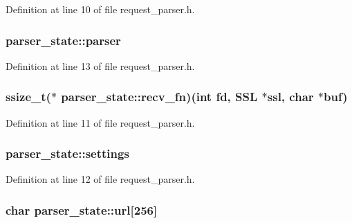 Definition at line 10 of file request\-\_\-parser.\-h.

\hypertarget{structparser__state_aaf6745c9db055761cd8da5f0d5e76d04}{
\subsubsection[{parser}]{ parser\-\_\-state\-::parser}}\label{structparser__state_aaf6745c9db055761cd8da5f0d5e76d04}


Definition at line 13 of file request\-\_\-parser.\-h.

\hypertarget{structparser__state_ad02c5f0bb7a54a5be951120be343e767}{
\subsubsection[{recv\-\_\-fn}]{\setlength{\rightskip}{0pt plus 5cm}ssize\-\_\-t($\ast$ parser\-\_\-state\-::recv\-\_\-fn)(int fd, S\-S\-L $\ast$ssl, char $\ast$buf)}}\label{structparser__state_ad02c5f0bb7a54a5be951120be343e767}


Definition at line 11 of file request\-\_\-parser.\-h.

\hypertarget{structparser__state_a88886f7995880a05fd64c6ce943c4d2b}{
\subsubsection[{settings}]{ parser\-\_\-state\-::settings}}\label{structparser__state_a88886f7995880a05fd64c6ce943c4d2b}


Definition at line 12 of file request\-\_\-parser.\-h.

\hypertarget{structparser__state_a64222808a9174a17ae2d25cb7ab72383}{
\subsubsection[{url}]{\setlength{\rightskip}{0pt plus 5cm}char parser\-\_\-state\-::url\mbox{[}256\mbox{]}}}\label{structparser__state_a64222808a9174a17ae2d25cb7ab72383}


